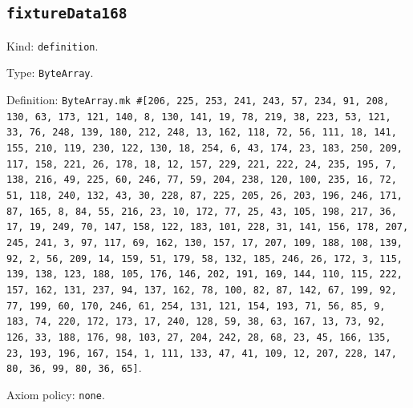 \documentclass[11pt]{article}
\begin{document}
\subsection*{\texttt{fixtureData168}}
\noindent Kind: \texttt{definition}.\par
\noindent Type: \texttt{ByteArray}.\par
\noindent Definition: \texttt{ByteArray.mk \#[206, 225, 253, 241, 243, 57, 234, 91, 208, 130, 63, 173, 121, 140, 8, 130, 141, 19, 78, 219, 38, 223, 53, 121, 33, 76, 248, 139, 180, 212, 248, 13, 162, 118, 72, 56, 111, 18, 141, 155, 210, 119, 230, 122, 130, 18, 254, 6, 43, 174, 23, 183, 250, 209, 117, 158, 221, 26, 178, 18, 12, 157, 229, 221, 222, 24, 235, 195, 7, 138, 216, 49, 225, 60, 246, 77, 59, 204, 238, 120, 100, 235, 16, 72, 51, 118, 240, 132, 43, 30, 228, 87, 225, 205, 26, 203, 196, 246, 171, 87, 165, 8, 84, 55, 216, 23, 10, 172, 77, 25, 43, 105, 198, 217, 36, 17, 19, 249, 70, 147, 158, 122, 183, 101, 228, 31, 141, 156, 178, 207, 245, 241, 3, 97, 117, 69, 162, 130, 157, 17, 207, 109, 188, 108, 139, 92, 2, 56, 209, 14, 159, 51, 179, 58, 132, 185, 246, 26, 172, 3, 115, 139, 138, 123, 188, 105, 176, 146, 202, 191, 169, 144, 110, 115, 222, 157, 162, 131, 237, 94, 137, 162, 78, 100, 82, 87, 142, 67, 199, 92, 77, 199, 60, 170, 246, 61, 254, 131, 121, 154, 193, 71, 56, 85, 9, 183, 74, 220, 172, 173, 17, 240, 128, 59, 38, 63, 167, 13, 73, 92, 126, 33, 188, 176, 98, 103, 27, 204, 242, 28, 68, 23, 45, 166, 135, 23, 193, 196, 167, 154, 1, 111, 133, 47, 41, 109, 12, 207, 228, 147, 80, 36, 99, 80, 36, 65]}.\par
\noindent Axiom policy: \texttt{none}.\par
\end{document}
